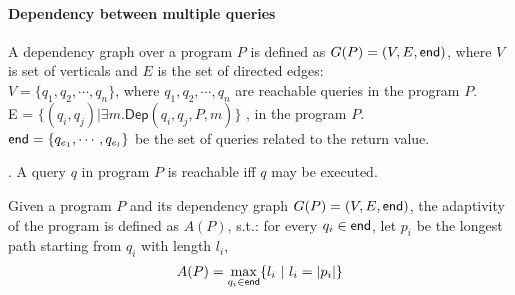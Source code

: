 \documentclass[a4paper,11pt]{article}
\begin{document}
%
\paragraph{Dependency between multiple queries }
%
\begin{defn}
A dependency graph over a program $P$ is defined as $G(P) = (V, E, \mathsf{end} )$, where $V$ is set of verticals and $E$ is the set of directed edges:
\\
%
    $V = \{q_1, q_2, \cdots, q_n \}$, where $q_1, q_2, \cdots, q_n$ are reachable queries in the program $P$.
\\
%
E = $\{  (q_{i}, q_{j}) | \exists m. \mathsf{Dep}(q_i, q_{j}, P, m)  \} $ , in the program $P$.
%
\\
%
$\mathsf{end} = \{q_{e_1}, \cdots, q_{e_l}\}$ be the set of queries related to the return value.
\end{defn}
%
\begin{defn}.
A query $q$ in program $P$ is reachable iff $q$ may be executed.
\end{defn}
%
%
%
\begin{defn}[Adaptivity]
Given a program $P$ and its dependency graph $G(P) = (V, E, \mathsf{end})$, the adaptivity of the program is defined as $A(P)$, s.t.:
for every $q_i \in \mathsf{end}$, let $p_i$ be the longest path starting from $q_i$ with length $l_i$,
%
$$A(P) = \max\limits_{q_i \in \mathsf{end}}\{l_i ~|~ l_i = |p_i| \}$$
\end{defn}
%
%
%
\end{document}
